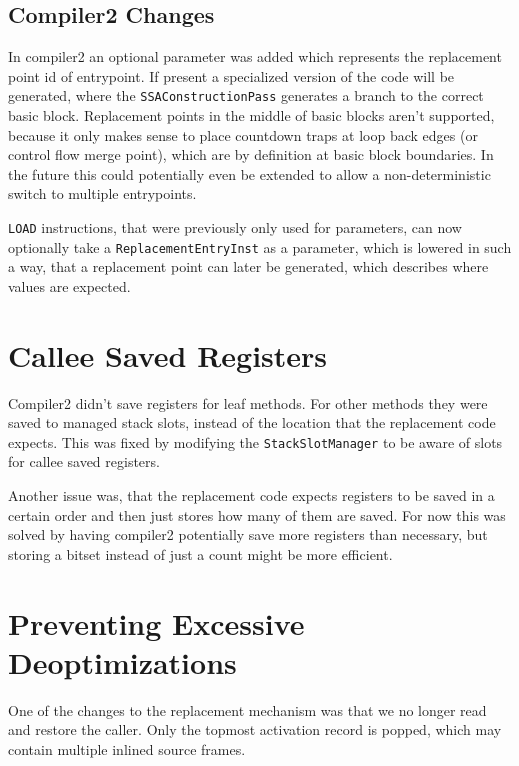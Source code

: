 \documentclass[draft,final]{vutinfth} %
\begin{document}
    \subsection{Compiler2 Changes}

    In compiler2 an optional parameter was added which represents the replacement point id of entrypoint.
    If present a specialized version of the code will be generated,
    where the \lstinline{SSAConstructionPass} generates a branch to the correct basic block.
    Replacement points in the middle of basic blocks aren't supported,
    because it only makes sense to place countdown traps at loop back edges (or control flow merge point),
    which are by definition at basic block boundaries.
    In the future this could potentially even be extended to allow
    a non-deterministic switch to multiple entrypoints.

    \lstinline{LOAD} instructions,
    that were previously only used for parameters,
    can now optionally take a \lstinline{ReplacementEntryInst}
    as a parameter,
    which is lowered in such a way,
    that a replacement point can later be generated,
    which describes where values are expected.

    \section{Callee Saved Registers}

    Compiler2 didn't save registers for leaf methods.
    For other methods they were saved to managed stack slots,
    instead of the location that the replacement code expects.
    This was fixed by modifying the \lstinline{StackSlotManager}
    to be aware of slots for callee saved registers.

    Another issue was, that the replacement code expects
    registers to be saved in a certain order and then just stores how many
    of them are saved.
    For now this was solved by having compiler2 potentially save
    more registers than necessary,
    but storing a bitset instead of just a count might be more efficient.


    \section{Preventing Excessive Deoptimizations}

    One of the changes to the replacement mechanism
    was that we no longer read and restore the caller.
    Only the topmost activation record is popped,
    which may contain multiple inlined source frames.
\end{document}
